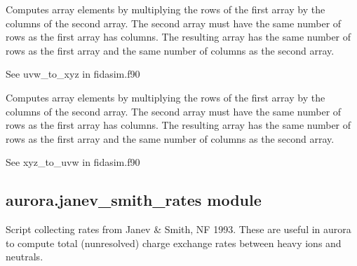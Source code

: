 \documentclass[letterpaper,10pt,english]{sphinxmanual}
\begin{document}

\begin{fulllineitems}
\label{\detokenize{aurora:aurora.nbi_neutrals.uvw_xyz}}
Computes array elements by multiplying the rows of the first
array by the columns of the second array. The second array
must have the same number of rows as the first array has
columns. The resulting array has the same number of rows as
the first array and the same number of columns as the second
array.

See uvw\_to\_xyz in fidasim.f90

\end{fulllineitems}


\begin{fulllineitems}
\label{\detokenize{aurora:aurora.nbi_neutrals.xyz_uvw}}
Computes array elements by multiplying the rows of the first
array by the columns of the second array. The second array
must have the same number of rows as the first array has
columns. The resulting array has the same number of rows as
the first array and the same number of columns as the second
array.

See xyz\_to\_uvw in fidasim.f90

\end{fulllineitems}



\subsection{aurora.janev\_smith\_rates module}
\label{\detokenize{aurora:module-aurora.janev_smith_rates}}\label{\detokenize{aurora:aurora-janev-smith-rates-module}}
Script collecting rates from Janev \& Smith, NF 1993. 
These are useful in aurora to compute total (n\sphinxhyphen{}unresolved) charge exchange rates between heavy ions and neutrals.
\end{document}
